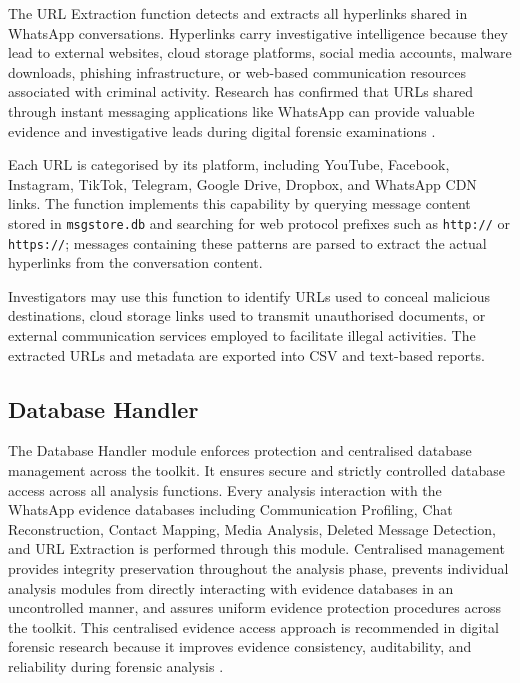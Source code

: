 \documentclass[12pt,a4paper]{report}
\begin{document}
The URL Extraction function detects and extracts all hyperlinks shared in WhatsApp conversations. Hyperlinks carry investigative intelligence because they lead to external websites, cloud storage platforms, social media accounts, malware downloads, phishing infrastructure, or web-based communication resources associated with criminal activity. Research has confirmed that URLs shared through instant messaging applications like WhatsApp can provide valuable evidence and investigative leads during digital forensic examinations \citep{mahajan2013,anglano2014}.

Each URL is categorised by its platform, including YouTube, Facebook, Instagram, TikTok, Telegram, Google Drive, Dropbox, and WhatsApp CDN links. The function implements this capability by querying message content stored in \texttt{msgstore.db} and searching for web protocol prefixes such as \texttt{http://} or \texttt{https://}; messages containing these patterns are parsed to extract the actual hyperlinks from the conversation content.

Investigators may use this function to identify URLs used to conceal malicious destinations, cloud storage links used to transmit unauthorised documents, or external communication services employed to facilitate illegal activities. The extracted URLs and metadata are exported into CSV and text-based reports.

\subsection{Database Handler}

The Database Handler module enforces protection and centralised database management across the toolkit. It ensures secure and strictly controlled database access across all analysis functions. Every analysis interaction with the WhatsApp evidence databases including Communication Profiling, Chat Reconstruction, Contact Mapping, Media Analysis, Deleted Message Detection, and URL Extraction is performed through this module. Centralised management provides integrity preservation throughout the analysis phase, prevents individual analysis modules from directly interacting with evidence databases in an uncontrolled manner, and assures uniform evidence protection procedures across the toolkit. This centralised evidence access approach is recommended in digital forensic research because it improves evidence consistency, auditability, and reliability during forensic analysis \citep{casey2011,carrier2005}.
\end{document}
